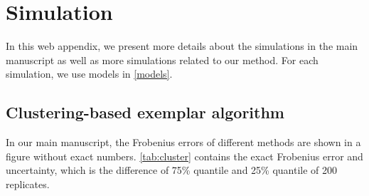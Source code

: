 \documentclass[useAMS,referee,usenatbib]{biom}
\begin{document}
\pagebreak
\appendix
\section*{Simulation} 
In this web appendix, we present more details about the simulations in the main manuscript as well as more simulations related to our method. For each simulation, we use models in \ref{models}.
\subsection{Clustering-based exemplar algorithm}
In our main manuscript, the Frobenius errors of different methods are shown in a figure without exact numbers. \ref{tab:cluster} contains the exact Frobenius error and uncertainty, which is the difference of 75\% quantile and 25\% quantile of 200 replicates.
\end{document}
